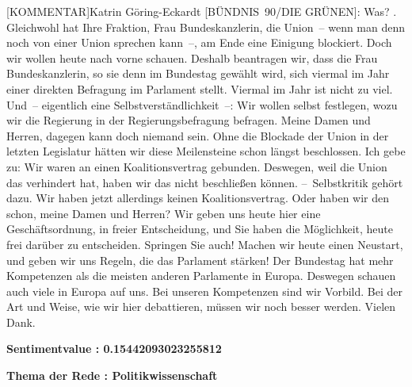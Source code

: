 \documentclass[a4paper,11pt]{article}
\begin{document}
[KOMMENTAR]Katrin Göring-Eckardt [BÜNDNIS 90/DIE GRÜNEN]: Was?
. Gleichwohl hat Ihre Fraktion, Frau Bundeskanzlerin, die Union – wenn man denn noch von einer Union sprechen kann –, am Ende eine Einigung blockiert. Doch wir wollen heute nach vorne schauen. Deshalb beantragen wir, dass die Frau Bundeskanzlerin, so sie denn im Bundestag gewählt wird, sich viermal im Jahr einer direkten Befragung im Parlament stellt. Viermal im Jahr ist nicht zu viel. Und – eigentlich eine Selbstverständlichkeit –: Wir wollen selbst festlegen, wozu wir die Regierung in der Regierungsbefragung befragen. Meine Damen und Herren, dagegen kann doch niemand sein. Ohne die Blockade der Union in der letzten Legislatur hätten wir diese Meilensteine schon längst beschlossen. Ich gebe zu: Wir waren an einen Koalitionsvertrag gebunden. Deswegen, weil die Union das verhindert hat, haben wir das nicht beschließen können. – Selbstkritik gehört dazu. Wir haben jetzt allerdings keinen Koalitionsvertrag. Oder haben wir den schon, meine Damen und Herren? Wir geben uns heute hier eine Geschäftsordnung, in freier Entscheidung, und Sie haben die Möglichkeit, heute frei darüber zu entscheiden. Springen Sie auch! Machen wir heute einen Neustart, und geben wir uns Regeln, die das Parlament stärken! Der Bundestag hat mehr Kompetenzen als die meisten anderen Parlamente in Europa. Deswegen schauen auch viele in Europa auf uns. Bei unseren Kompetenzen sind wir Vorbild. Bei der Art und Weise, wie wir hier debattieren, müssen wir noch besser werden. Vielen Dank.

\textbf{Sentimentvalue : 0.15442093023255812}

\textbf{Thema der Rede : Politikwissenschaft}
\vspace*{1cm}
\end{document}
